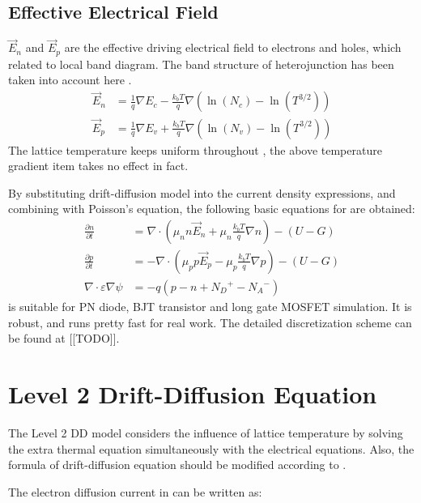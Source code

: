 \documentclass[oneside,12pt]{cgd_book}
\begin{document}
\subsection{Effective Electrical Field}$\vec{E}_n$ and $\vec{E}_p$
are the effective
        driving electrical field to electrons and holes, which related to local band diagram. The band structure of
        heterojunction has been taken into account here \cite{Lindefelt1994}.
\begin{subequations}
\label{eq:Equation:DDML1:DrivingField}
\begin{align}
 \vec{E}_n  &= \frac{1}{q}\nabla E_c - \frac{k_b T}{q}\nabla \left( \ln (N_c ) - \ln (T^{3/2} )
        \right)\\
 \vec{E}_p  &= \frac{1}{q}\nabla E_v + \frac{k_b T}{q}\nabla \left( \ln (N_v ) - \ln (T^{3/2} )
        \right)
\end{align}
\end{subequations}
The lattice temperature keeps uniform throughout , the above temperature
      gradient item takes no effect in fact.
\par
By substituting drift-diffusion model into the current density expressions, and combining with Poisson's
      equation, the following basic equations for 
are obtained:
\begin{subequations}
\begin{align}
 \frac{\partial n}{\partial t}  &= \nabla \cdot \left (\mu_n n \vec{E}_n + \mu_n\frac{k_b T}{q}\nabla n \right
        ) - (U - G)\\
 \frac{\partial p}{\partial t}  &= -\nabla \cdot \left (\mu_p p\vec{E}_p - \mu_p\frac{k_b T}{q}\nabla p \right
        ) - (U - G)\\
 \nabla \cdot \varepsilon \nabla \psi  &= - q(p - n + {N_D}^{+} - {N_A}^{-} )
\end{align}
\end{subequations}
 is suitable for PN diode, BJT transistor and long gate MOSFET simulation. It is
      robust, and runs pretty fast for real work. The detailed discretization scheme can be found at [[TODO]].
\par
\section[sec:Equation:DDML2]{Level 2 Drift-Diffusion Equation}
\label{DDML2+Equation}The Level 2 DD model considers the influence of lattice temperature by solving the extra thermal
      equation simultaneously with the electrical equations. Also, the formula of drift-diffusion equation should be
      modified according to \cite{Selberherr1984}.
\par
\label{Drift-diffusion current+DDML2}The electron diffusion current in
 can be written as:
\par
\end{document}
